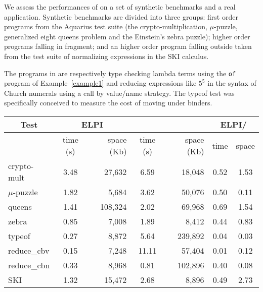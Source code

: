 \documentclass{llncs}
\begin{document}
We assess the performances of \elpi{} on a set of synthetic benchmarks and
a real application. Synthetic benchmarks are divided into three groups:
first order programs from the Aquarius test suite (the
crypto-multiplication, $\mu$-puzzle,
generalized eight queens problem and the Einstein's zebra puzzle);
higher order programs falling in \rff{} fragment; and an higher
order program falling outside \rff{} taken from the test suite of
\tedius{} normalizing expressions in the SKI calculus.

The programs in \rff{} are respectively type checking lambda terms using
the \verb+of+ program of Example~\ref{example1} and reducing expressions like
$5^5$ in the syntax of Church numerals using a call by value/name strategy.
The typeof test was specifically conceived to measure the cost of moving under
binders.

\begin{center}
  \scriptsize 
  \begin{tabular}{|p{1.5cm}||c|r||c|r||c|c|}
    \hline
      \multicolumn{1}{|c||}{Test} &
      \multicolumn{2}{|c||}{ELPI} &
      \multicolumn{2}{|c||}{\tedius{}} &
      \multicolumn{2}{|c|}{ELPI/\tedius{}} \\
    \hline
    &  time (s)     & space (Kb)  & time (s) & space (Kb) &  time & space \\
    \hline
    \hline
    crypto-mult &  3.48 & 27,632  & 6.59 & 18,048 &  0.52 & 1.53 \\
    \hline    
    $\mu$-puzzle &  1.82 & 5,684 &  3.62 & 50,076 &  0.50 & 0.11 \\
    \hline
    queens &  1.41  & 108,324 &  2.02 & 69,968 &  0.69 & 1.54 \\
    \hline    
    zebra &  0.85 & 7,008 &  1.89 & 8,412 &  0.44 & 0.83 \\
    \hline     
    \hline
    typeof &  0.27 & 8,872 &  5.64 & 239,892 &  0.04 & 0.03 \\
    \hline
    reduce\_cbv &  0.15 & 7,248 &  11.11 & 57,404  & 0.01 & 0.12 \\
    \hline
    reduce\_cbn &  0.33 & 8,968 &  0.81 & 102,896  & 0.40 & 0.08 \\
    \hline
    \hline
    SKI &  1.32 & 15,472 &  2.68 & 8,896  & 0.49 & 2.73 \\
    \hline
    
  \end{tabular}
\end{center}
\end{document}
